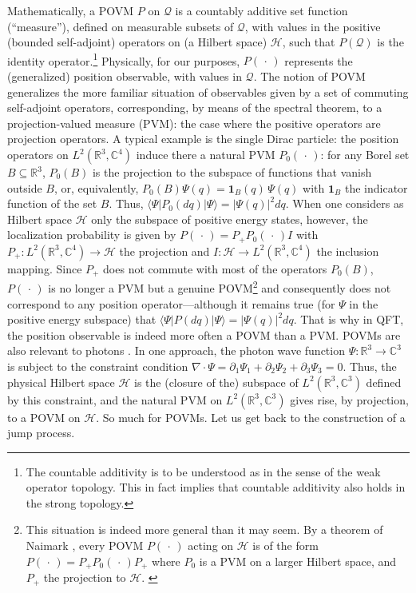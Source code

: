 \documentclass[12pt]{article}
\newcommand{\CCC}{\mathbb{C}} %
\newcommand{\RRR}{\mathbb{R}} %
\newcommand{\1}{\mathbf{1}} %
\newcommand{\Hilbert}{\mathscr{H}}
\renewcommand{\sp}[2]{\langle #1 | #2 \rangle} %
\newcommand{\conf}{\mathcal{Q}} %
\newcommand{\pov}{{P}}%
\begin{document}
Mathematically, a POVM $\pov$ on $\conf$ is a countably additive set
function (``measure''), defined on measurable subsets of $\conf$, with
values in the positive (bounded self-adjoint) operators on (a Hilbert
space) $\Hilbert$, such that $\pov(\conf)$ is the identity
operator.\footnote{The countable additivity is to be understood as in
the sense of the weak operator topology. This in fact implies that
countable additivity also holds in the strong topology.}  Physically,
for our purposes, $\pov(\,\cdot\,)$ represents the (generalized)
position observable, with values in $\conf$.  The notion of POVM
generalizes the more familiar situation of observables given by a set
of commuting self-adjoint operators, corresponding, by means of the
spectral theorem, to a projection-valued measure (PVM): the case where
the positive operators are projection operators.  A typical example is
the single Dirac particle: the position operators on
$L^2(\RRR^3,\CCC^4)$ induce there a natural PVM $\pov_0(\,\cdot\,)$:
for any Borel set $B\subseteq \RRR^3$, $\pov_0(B)$ is the projection
to the subspace of functions that vanish outside $B$, or,
equivalently, $\pov_0(B)\Psi(q) = \1_B(q) \, \Psi(q)$ with $\1_B$ the
indicator function of the set $B$.  Thus, $\sp{\Psi} {\pov_0 (dq)|
\Psi} = |\Psi(q)|^2 dq$.  When one considers as Hilbert space
$\Hilbert$ only the subspace of positive energy states, however, the
localization probability is given by $\pov(\,\cdot\,) = P_+
\pov_0(\,\cdot\,) I$ with $P_+:L^2(\RRR^3,\CCC^4) \to \Hilbert$ the
projection and $I:\Hilbert \to L^2(\RRR^3,\CCC^4)$ the inclusion
mapping. Since $P_+$ does not commute with most of the operators
$\pov_0(B)$, $\pov (\,\cdot\,)$ is no longer a PVM but a genuine
POVM\footnote{This situation is indeed more general than it may seem.
By a theorem of Naimark \cite[p.~142]{Davies}, every POVM $\pov
(\,\cdot\,)$ acting on $\Hilbert$ is of the form $\pov(\,\cdot\,) =
P_+ \pov_0 (\,\cdot\,) P_+$ where $\pov_0$ is a PVM on a larger
Hilbert space, and $P_+$ the projection to
$\Hilbert$. \label{ft:Naimark}} and consequently does not correspond
to any position operator---although it remains true (for $\Psi$ in the
positive energy subspace) that $\sp{\Psi}{\pov(dq)| \Psi} =
|\Psi(q)|^2 dq$.  That is why in QFT, the position observable is
indeed more often a POVM than a PVM. POVMs are also relevant to
photons \cite{ali,kraus}.  In one approach, the photon wave function
$\Psi: \RRR^3 \to \CCC^3$ is subject to the constraint condition
$\nabla \cdot \Psi = \partial_1 \Psi_1 + \partial_2 \Psi_2 +
\partial_3 \Psi_3 =0$. Thus, the physical Hilbert space $\Hilbert$ is
the (closure of the) subspace of $L^2(\RRR^3,\CCC^3)$ defined by this
constraint, and the natural PVM on $L^2(\RRR^3,\CCC^3)$ gives rise, by
projection, to a POVM on $\Hilbert$.  So much for POVMs. Let us get
back to the construction of a jump process.
\end{document}
